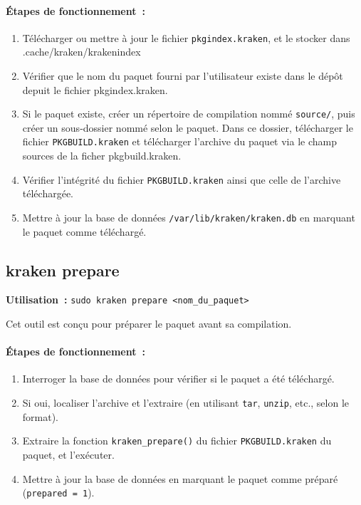 \paragraph{Étapes de fonctionnement :}
\begin{enumerate}
    \item Télécharger ou mettre à jour le fichier \texttt{pkgindex.kraken}, et le stocker dans .cache/kraken/krakenindex
    \item Vérifier que le nom du paquet fourni par l'utilisateur existe dans le dépôt depuit le fichier pkgindex.kraken.
    \item Si le paquet existe, créer un répertoire de compilation nommé \texttt{source/}, puis créer un sous-dossier nommé selon le paquet. Dans ce dossier, télécharger le fichier \texttt{PKGBUILD.kraken} et télécharger l’archive du paquet via le champ sources de la ficher pkgbuild.kraken.
    \item Vérifier l'intégrité du fichier \texttt{PKGBUILD.kraken} ainsi que celle de l’archive téléchargée.
    \item Mettre à jour la base de données \texttt{/var/lib/kraken/kraken.db} en marquant le paquet comme téléchargé.
\end{enumerate}





\subsection{kraken prepare}

\textbf{Utilisation :} \texttt{sudo kraken prepare <nom\_du\_paquet>}

Cet outil est conçu pour préparer le paquet avant sa compilation.

\paragraph{Étapes de fonctionnement :}
\begin{enumerate}
    \item Interroger la base de données pour vérifier si le paquet a été téléchargé.
    \item Si oui, localiser l’archive et l’extraire (en utilisant \texttt{tar}, \texttt{unzip}, etc., selon le format).
    \item Extraire la fonction \texttt{kraken\_prepare()} du fichier \texttt{PKGBUILD.kraken} du paquet, et l’exécuter.
    \item Mettre à jour la base de données en marquant le paquet comme préparé (\texttt{prepared = 1}).
\end{enumerate}


